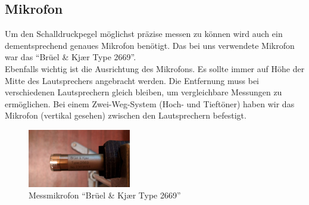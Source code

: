 \subsection*{Mikrofon}\label{subsec:5.2.4}
Um den Schalldruckpegel möglichst präzise messen zu können wird auch ein dementsprechend genaues Mikrofon benötigt. Das bei uns verwendete Mikrofon war das \enquote{Brüel \& Kj\ae r Type 2669}. \\
Ebenfalls wichtig ist die Ausrichtung des Mikrofons. Es sollte immer auf Höhe der Mitte des Lautsprechers angebracht werden. Die Entfernung muss bei verschiedenen Lautsprechern gleich bleiben, um vergleichbare Messungen zu ermöglichen. Bei einem Zwei-Weg-System (Hoch- und Tieftöner) haben wir das Mikrofon (vertikal gesehen) zwischen den Lautsprechern befestigt.
\begin{figure} [H]
	\centering
	\includegraphics[width=0.4\textwidth]{img/LSMessung/mikro.png}
	\caption{Messmikrofon \enquote{Brüel \& Kj\ae r Type 2669}}
	\label{fig:5.2.4.1}
\end{figure}